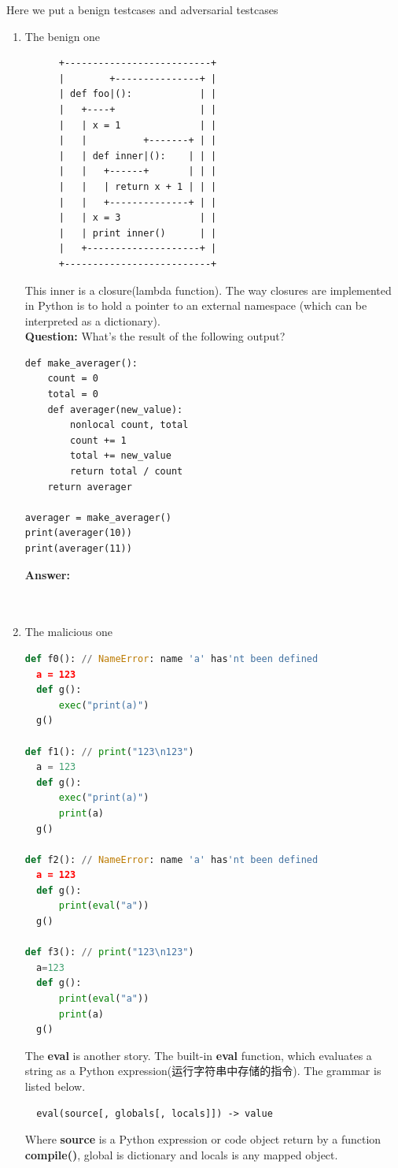 \documentclass[a4paper]{article}
\theoremstyle{definition}
\begin{document}
Here we put a benign testcases and adversarial testcases
\begin{enumerate}
  \item  The benign one
    \begin{lstlisting}
      +--------------------------+
      |        +---------------+ |
      | def foo|():            | |
      |   +----+               | |
      |   | x = 1              | |
      |   |          +-------+ | |
      |   | def inner|():    | | |
      |   |   +------+       | | |
      |   |   | return x + 1 | | |
      |   |   +--------------+ | |
      |   | x = 3              | |
      |   | print inner()      | |
      |   +--------------------+ |
      +--------------------------+
    \end{lstlisting}

  This inner is a closure(lambda function). The way closures are implemented in Python is to hold a pointer to an external namespace (which can be interpreted as a dictionary).
\\
  \textbf{Question:} What's the result of the following output?
\begin{lstlisting}
def make_averager():
    count = 0
    total = 0
    def averager(new_value):
        nonlocal count, total
        count += 1
        total += new_value
        return total / count
    return averager

averager = make_averager()
print(averager(10))
print(averager(11))
\end{lstlisting}
\textbf{Answer:}
\\
\\
\\
  \item The malicious one
\begin{lstlisting}[language=Python]
def f0(): // NameError: name 'a' has'nt been defined
  a = 123
  def g():
      exec("print(a)")
  g()

def f1(): // print("123\n123")
  a = 123
  def g():
      exec("print(a)")
      print(a)
  g()

def f2(): // NameError: name 'a' has'nt been defined
  a = 123
  def g():
      print(eval("a"))
  g()

def f3(): // print("123\n123")
  a=123
  def g():
      print(eval("a"))
      print(a)
  g()
  \end{lstlisting}
The \textbf{eval} is another story. The built-in \textbf{eval} function, which evaluates a string as a Python expression(运行字符串中存储的指令). The grammar is listed below.
\begin{lstlisting}
  eval(source[, globals[, locals]]) -> value
\end{lstlisting}
Where \textbf{source} is a Python expression or code object return by a function \textbf{compile()}, global is dictionary and locals is any mapped object. 

\end{enumerate}
\end{document}
